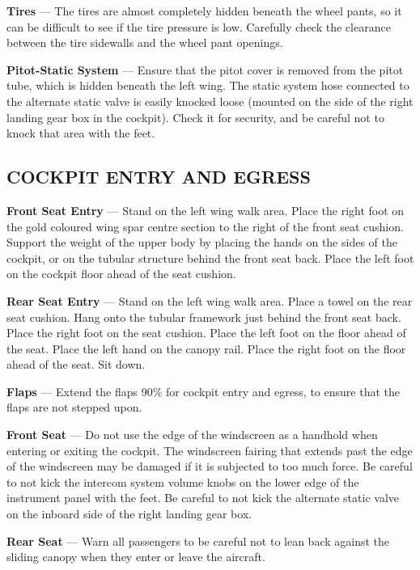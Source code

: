 \textbf{Tires} --- The tires are almost completely hidden beneath the wheel pants, so it can be difficult to see if the tire pressure is low. Carefully check the clearance between the tire sidewalls and the wheel pant openings.

\textbf{Pitot-Static System} --- Ensure that the pitot cover is removed from the pitot tube, which is hidden beneath the left wing. The static system hose connected to the alternate static valve is easily knocked loose (mounted on the side of the right landing gear box in the cockpit). Check it for security, and be careful not to knock that area with the feet.

\subsection{COCKPIT ENTRY AND EGRESS}
\textbf{Front Seat Entry} --- Stand on the left wing walk area. 
Place the right foot on the gold coloured wing spar centre section to the right of the front seat cushion. Support the weight of the upper body by placing the hands on the sides of the cockpit, or on the tubular structure behind the front seat back. Place the left foot on the cockpit floor ahead of the seat cushion.

\textbf{Rear Seat Entry} --- Stand on the left wing walk area. Place a towel on the rear seat cushion. Hang onto the tubular framework just behind the front seat back. Place the right foot on the seat cushion. Place the left foot on the floor ahead of the seat. Place the left hand on the canopy rail. Place the right foot on the floor ahead of the seat. Sit down.

\begin{Note}[CAUTIONS]
  \textbf{Flaps} --- Extend the flaps 90\% for cockpit entry and egress, to ensure that the flaps are not stepped upon.
  
  \textbf{Front Seat} --- Do not use the edge of the windscreen as a handhold when entering or exiting the cockpit. The windscreen fairing that extends past the edge of the
windscreen may be damaged if it is subjected to too much force. Be careful to not kick the intercom system volume knobs on the lower edge of the instrument panel with the feet. Be careful to not kick the alternate static valve on the inboard side of the right landing gear box.

  \textbf{Rear Seat} --- Warn all passengers to be careful not to lean back against the sliding canopy when they enter or leave the aircraft.
  \end{Note}
  
